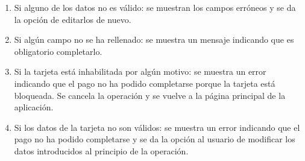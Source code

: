 \begin{enumerate}
\begin{enumerate}
		\item Si alguno de los datos no es válido: se muestran los campos erróneos y se da la opción de editarlos de nuevo.
		\item Si algún campo no se ha rellenado: se muestra un mensaje indicando que es obligatorio completarlo.
		\item Si la tarjeta está inhabilitada por algún motivo: se muestra un error indicando que el pago no ha podido completarse porque la tarjeta está bloqueada. Se cancela la operación y se vuelve a la página principal de la aplicación.
		\item Si los datos de la tarjeta no son válidos: se muestra un error indicando que el pago no ha podido completarse y se da la opción al usuario de modificar los datos introducidos al principio de la operación.
	\end{enumerate}
\end{enumerate}

